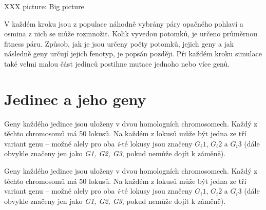 XXX picture: Big picture

V každém kroku jsou z populace náhodně vybrány páry opačného pohlaví a osmina z nich se může rozmnožit.
Kolik vyvedou potomků, je určeno průměrnou fitness páru. Způsob, jak je jsou určeny počty potomků, jejich geny a
jak následně geny určují jejich fenotyp, je popsán později.
Při každém kroku simulace také velmi malou část jedinců postihne mutace jednoho nebo více genů.

\section{Jedinec a jeho geny}

Geny každého jedince jsou uloženy v dvou homologních chromosomech. Každý z těchto chromosomů má 50 lokusů.  Na každém z lokusů může být jedna ze tří variant genu -- možné alely pro oba \textit{i}-té lokusy jsou značeny $G_i{}1$, $G_i{}2$ a $G_i{}3$ (dále obvykle značeny jen jako \textit{G1, G2, G3}, pokud nemůže dojít k záměně).


Geny každého jedince jsou uloženy v dvou homologních chromosomech. Každý z těchto chromosomů má 50 lokusů.
Na každém z lokusů může být jedna ze tří variant genu -- možné alely pro oba \textit{i}-té lokusy jsou
značeny $G_i{}1$, $G_i{}2$ a $G_i{}3$ (dále obvykle značeny jen jako \textit{G1, G2, G3}, pokud nemůže dojít k záměně).


